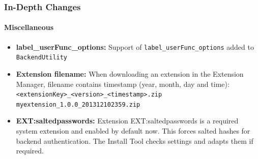 \begin{frame}[fragile]
	\frametitle{In-Depth Changes}
	\framesubtitle{Miscellaneous}

	\begin{itemize}

		\item \textbf{label\_userFunc\_options:}\newline
			\small
				Support of \texttt{label\_userFunc\_options} added to \texttt{BackendUtility}
			\normalsize

		\item \textbf{Extension filename:}\newline
			\small
				When downloading an extension in the Extension Manager, filename contains timestamp (year, month, day and time):\newline
				\texttt{<extensionKey>\_<version>\_<timestamp>.zip}\newline
				\texttt{myextension\_1.0.0\_201312102359.zip}
			\normalsize

		\item \textbf{EXT:saltedpasswords:}\newline
			\small
				Extension EXT:saltedpasswords is a required system extension and enabled by default now.
				This forces salted hashes for backend authentication. The Install Tool checks settings and adapts them if required.
			\normalsize

	\end{itemize}
	
\end{frame}


